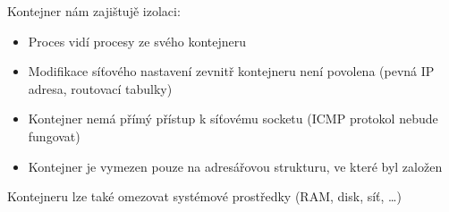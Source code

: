 Kontejner nám zajištujě izolaci:
\begin{itemize}
	\item Proces vidí procesy ze svého kontejneru
	\item Modifikace síťového nastavení zevnitř kontejneru není povolena (pevná IP adresa, routovací tabulky)
	\item Kontejner nemá přímý přístup k síťovému socketu (ICMP protokol nebude fungovat)
	\item Kontejner je vymezen pouze na adresářovou strukturu, ve které byl založen
\end{itemize}

Kontejneru lze také omezovat systémové prostředky (RAM, disk, síť, \ldots)


